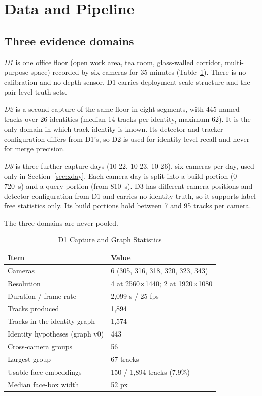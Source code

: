 \documentclass[journal]{IEEEtran}
\begin{document}
\section{Data and Pipeline}\label{sec:data}
\subsection{Three evidence domains}
\emph{D1} is one office floor (open work area, tea room, glass-walled corridor, multi-purpose space) recorded by six cameras for 35 minutes (Table~\ref{tab:d1}). There is no calibration and no depth sensor. D1 carries deployment-scale structure and the pair-level truth sets.

\emph{D2} is a second capture of the same floor in eight segments, with 445 named tracks over 26 identities (median 14 tracks per identity, maximum 62). It is the only domain in which track identity is known. Its detector and tracker configuration differs from D1's, so D2 is used for identity-level recall and never for merge precision.

\emph{D3} is three further capture days (10-22, 10-23, 10-26), six cameras per day, used only in Section~\ref{sec:xday}. Each camera-day is split into a build portion (0--720~s) and a query portion (from 810~s). D3 has different camera positions and detector configuration from D1 and carries no identity truth, so it supports label-free statistics only. Its build portions hold between 7 and 95 tracks per camera.

The three domains are never pooled.

\begin{table}[t]
\caption{D1 Capture and Graph Statistics}\label{tab:d1}
\centering
\begin{tabular}{@{}ll@{}}
\toprule
Item & Value\\
\midrule
Cameras & 6 (305, 316, 318, 320, 323, 343)\\
Resolution & 4 at 2560$\times$1440; 2 at 1920$\times$1080\\
Duration / frame rate & 2,099 s / 25 fps\\
Tracks produced & 1,894\\
Tracks in the identity graph & 1,574\\
Identity hypotheses (graph v0) & 443\\
Cross-camera groups & 56\\
Largest group & 67 tracks\\
Usable face embeddings & 150 / 1,894 tracks (7.9\%)\\
Median face-box width & 52 px\\
\bottomrule
\end{tabular}
\end{table}
\end{document}
